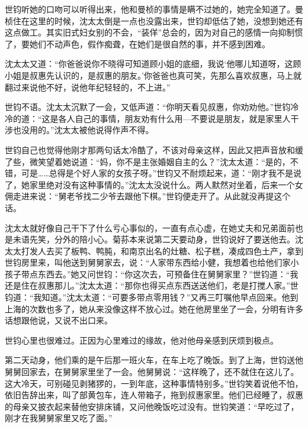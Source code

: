 \par 世钧听她的口吻可以听得出来，他和曼桢的事情是瞒不过她的，她完全知道了。曼桢住在这里的时候，沈太太倒是一点也没露出来，世钧却低估了她，没想到她还有这点做工。其实旧式妇女别的不会，“装佯”总会的，因为对自己的感情一向抑制惯了，要她们不动声色，假作痴聋，在她们是很自然的事，并不感到困难。
\par 沈太太又道：“你爸爸说你不晓得可知道顾小姐的底细，我说‘他哪儿知道呀，这顾小姐是叔惠先认识的，是叔惠的朋友。’你爸爸也真可笑，先那么喜欢叔惠，马上就翻过来说他不好，说他年纪轻轻的，不上进。”
\par 世钧不语。沈太太沉默了一会，又低声道：“你明天看见叔惠，你劝劝他。”世钧冷冷的道：“这是各人自己的事情，朋友劝有什么用—不要说是朋友，就是家里人干涉也没用的。”沈太太被他说得作声不得。
\par 世钧自己也觉得他刚才那两句话太冷酷了，不该对母亲这样，因此又把声音放和缓了些，微笑望着她说道：“妈，你不是主张婚姻自主的么？”沈太太道：“是的，不错，可是……总得是个好人家的女孩子呀。”世钧又不耐烦起来，道：“刚才我不是说了，她家里绝对没有这种事情的。”沈太太没说什么。两人默然对坐着，后来一个女佣走进来说：“舅老爷找二少爷去跟他下棋。”世钧便走开了。从此就没再提这个话。
\par 沈太太就好像自己干下了什么亏心事似的，一直有点心虚，在她丈夫和兄弟面前也是未语先笑，分外的陪小心。菊荪本来说第二天要动身，世钧说好了要送他去。沈太太打发人去买了板鸭、鸭肫，和南京出名的灶糖、松子糕，凑成四色土产，拿到世钧房里来，叫他送到舅舅家去，说：“人家带东西给小健，我想着也给他们家小孩子带点东西去。”她又问世钧：“你这次去，可预备住在舅舅家里？”世钧道：“我还是住在叔惠那儿。”沈太太道：“那你也得买点东西送送他们，老是打搅人家。”世钧道：“我知道。”沈太太道：“可要多带点零用钱？”又再三叮嘱他早点回来。他到上海的次数也多了，她从来没像这样不放心过。她在他房里坐了一会，分明有许多话想跟他说，又说不出口来。
\par 世钧心里也很难过。正因为心里难过的缘故，他对他母亲感到厌烦到极点。
\par 第二天动身，他们乘的是午后那一班火车，在车上吃了晚饭。到了上海，世钧送他舅舅回家去，在舅舅家里坐了一会。他舅舅说：“这样晚了，还不就住在这儿了。这大冷天，可别碰见剥猪猡的，一到年底，这种事情特别多。”世钧笑着说他不怕，依旧告辞出来，叫了部黄包车，连人带箱子，拖到叔惠家里。他们已经睡了，叔惠的母亲又披衣起来替他安排床铺，又问他晚饭吃过没有。世钧笑道：“早吃过了，刚才在我舅舅家里又吃了面。”
